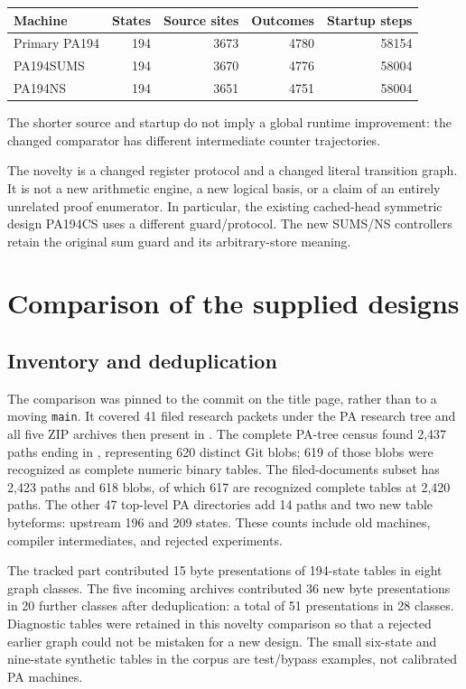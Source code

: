 \documentclass[11pt,a4paper]{article}
\newcommand{\file}[1]{\path{#1}}
\begin{document}
\begin{center}
\begin{tabular}{lrrrr}
\toprule
Machine & States & Source sites & Outcomes & Startup steps\\
\midrule
Primary PA194 &194&3673&4780&58154\\
PA194SUMS &194&3670&4776&58004\\
PA194NS &194&3651&4751&58004\\
\bottomrule
\end{tabular}
\end{center}
The shorter source and startup do not imply a global runtime improvement:
the changed comparator has different intermediate counter trajectories.

The novelty is a changed register protocol and a changed literal transition
graph. It is not a new arithmetic engine, a new logical basis, or a claim
of an entirely unrelated proof enumerator. In particular, the existing
cached-head symmetric design PA194CS uses a different guard/protocol.
The new SUMS/NS controllers retain the original sum guard and its
arbitrary-store meaning.

\section{Comparison of the supplied designs}
\subsection{Inventory and deduplication}
The comparison was pinned to the commit on the title page, rather than to
a moving \texttt{main}. It covered 41 filed research packets under the PA
research tree and all five ZIP archives then present in
\file{docs/incoming}. The complete PA-tree census found 2,437 paths ending in
\file{.tm}, representing 620 distinct Git blobs; 619 of those blobs were
recognized as complete numeric binary tables. The filed-documents subset
has 2,423 paths and 618 blobs, of which 617 are recognized complete tables
at 2,420 paths. The other 47 top-level PA directories add 14 paths and
two new table byteforms: upstream 196 and 209 states. These counts include
old machines, compiler intermediates, and rejected experiments.

The tracked part contributed 15 byte presentations of 194-state tables
in eight graph classes. The five incoming archives contributed 36 new
byte presentations in 20 further classes after deduplication: a total
of 51 presentations in 28 classes. Diagnostic tables were retained in
this novelty comparison so that a rejected earlier graph could not be
mistaken for a new design. The small six-state and nine-state synthetic
tables in the corpus are test/bypass examples, not calibrated PA machines.
\end{document}
